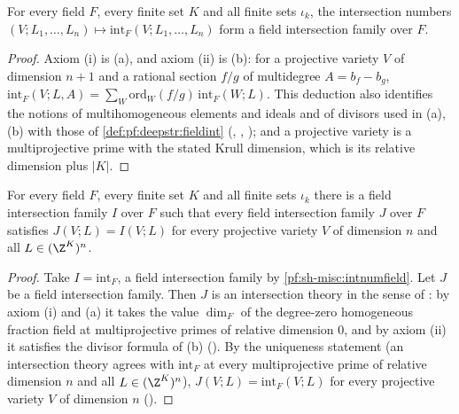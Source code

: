 \begin{theorem}\label{pf:sh-misc:intnumfield}
For every field $F$, every finite set $K$ and all finite sets $\iota_k$, the intersection numbers $(V;L_1,\dots,L_n)\mapsto\mathrm{int}_F(V;L_1,
\dots,L_n)$ form a field intersection family over $F$.
\end{theorem}

\begin{proof}
Axiom (i) is (a), and axiom (ii) is (b): for a projective variety $V$ of dimension $n+1$ and a rational section $f/g$ of multidegree
$A=b_f-b_g$, $\mathrm{int}_F(V;L,A)=\sum_W\mathrm{ord}_W(f/g)\,\mathrm{int}_F(W;L)$. This deduction also identifies the notions
of multihomogeneous elements and ideals and of divisors used in (a), (b) with those of \cref{def:pf:deepstr:fieldint}
(,
,
); and a projective variety is a multiprojective prime with
the stated Krull dimension, which is its relative dimension plus $|K|$.
\end{proof}

\begin{theorem}\label{pf:sh-misc:existsunique}
For every field $F$, every finite set $K$ and all finite sets $\iota_k$ there is a field intersection family $I$ over $F$ such that every
field intersection family $J$ over $F$ satisfies $J(V;L)=I(V;L)$ for every projective variety $V$ of dimension $n$ and all
$L\in(\Z^K)^n$.
\end{theorem}

\begin{proof}
Take $I=\mathrm{int}_F$, a field intersection family by \cref{pf:sh-misc:intnumfield}. Let $J$ be a field intersection family. Then $J$ is an
intersection theory in the sense of : by axiom (i) and (a) it
takes the value $\dim_F$ of the degree-zero homogeneous fraction field at multiprojective primes of relative dimension $0$, and by axiom (ii)
it satisfies the divisor formula of (b) (). By the
uniqueness statement  (an intersection theory agrees with
$\mathrm{int}_F$ at every multiprojective prime of relative dimension $n$ and all $L\in(\Z^K)^n$), $J(V;L)=\mathrm{int}_F(V;L)$ for every projective variety $V$ of dimension $n$
().
\end{proof}

